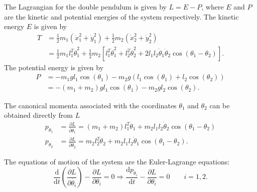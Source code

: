 The Lagrangian for the double pendulum is given by $L = E - P$, where $E$ and $P$ are the
  kinetic and potential energies of the system respectively.
The kinetic energy $E$ is given by \begin{equation}
  \label{eq:appendix:double_pendulum_kinetic_energy} \begin{aligned} T & =
  \frac{1}{2}m_1(\dot{x}_1^2 + \dot{y}_1^2) + \frac{1}{2}m_2(\dot{x}_2^2 + \dot{y}_2^2) \\ & =
  \frac{1}{2}m_1l_1^2\dot{\theta}_1^2 + \frac{1}{2}m_2\left[ l_1^2\dot{\theta}_1^2 +
    l_2^2\dot{\theta}_2^2 + 2 l_1 l_2 \dot{\theta}_1 \dot{\theta}_2 \cos(\theta_1 - \theta_2)
    \right].
\end{aligned}
\end{equation}
The potential energy is given by \begin{equation} \begin{aligned} P &= -m_1 g
  l_1\cos(\theta_1) - m_2 g \left( l_1 \cos(\theta_1) + l_2 \cos(\theta_2) \right) \\ &= -(m_1 +
  m_2)g l_1 \cos(\theta_1) - m_2 g l_2 \cos(\theta_2).
\end{aligned}
\end{equation}

The canonical momenta associated with the coordinates $\theta_1$ and $\theta_2$ can be
  obtained directly from $L$ \begin{equation} \begin{aligned} p_{\theta_1} &= \frac{\partial
    L}{\partial \dot{\theta}_1} = (m_1 + m_2)l_1^2 \dot{\theta}_1 + m_2 l_1 l_2 \dot{\theta}_2
  \cos(\theta_1 - \theta_2) \\ p_{\theta_2} &= \frac{\partial L}{\partial \dot{\theta}_2} = m_2
  l_2^2 \dot{\theta}_2 + m_2 l_1 l_2 \dot{\theta}_1 \cos(\theta_1 - \theta_2).
\end{aligned}
\end{equation}

The equations of motion of the system are the Euler-Lagrange equations:
  \begin{equation}\label{eq:appendix:double_pendulum_euler_lagrange}
  \frac{\mathrm{d}}{\mathrm{d}t} \left( \frac{\partial L}{\partial \dot{\theta_i}} \right) -
  \frac{\partial L}{\partial \theta_i} = 0 \Rightarrow \frac{\mathrm{d}p_{\theta_i}}{\mathrm{d}
  t} - \frac{\partial L}{\partial \theta_i} = 0 \qquad i = 1,2.
\end{equation}

